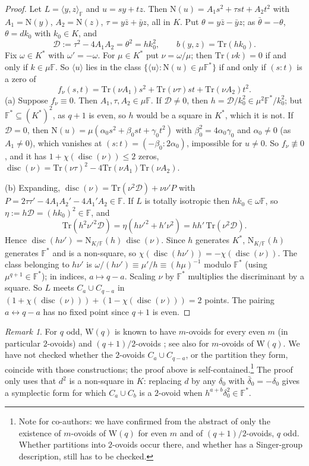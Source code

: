 \documentclass[11pt]{amsart}
\theoremstyle{definition}
\theoremstyle{remark}
\newtheorem{remark}[theorem]{Remark}
\newcommand{\F}{\mathbb{F}}
\newcommand{\Wq}{\mathrm{W}}
\newcommand{\Tr}{\mathrm{Tr}}
\newcommand{\Nm}{\mathrm{N}}
\begin{document}
\begin{proof}
Let $L=\langle y,z\rangle_\F$ and $u=sy+tz$. Then $\Nm(u)=A_1s^2+\tau st+A_2t^2$ with $A_1=\Nm(y)$, $A_2=\Nm(z)$, $\tau=y\bar z+\bar yz$, all in $K$. Put $\theta=y\bar z-\bar yz$; as $\bar\theta=-\theta$, $\theta=dk_0$ with $k_0\in K$, and
\[
\mathcal D:=\tau^2-4A_1A_2=\theta^2=hk_0^2,\qquad b(y,z)=\Tr(hk_0).
\]
Fix $\omega\in K^*$ with $\omega'=-\omega$. For $\mu\in K^*$ put $\nu=\omega/\mu$; then $\Tr(\nu k)=0$ if and only if $k\in\mu\F$. So $\langle u\rangle$ lies in the class $\{\langle u\rangle:\Nm(u)\in\mu\F^*\}$ if and only if $(s{:}t)$ is a zero of
\[
f_\nu(s,t)=\Tr(\nu A_1)s^2+\Tr(\nu\tau)st+\Tr(\nu A_2)t^2 .
\]
(a) Suppose $f_\nu\equiv0$. Then $A_1,\tau,A_2\in\mu\F$. If $\mathcal D\ne0$, then $h=\mathcal D/k_0^2\in\mu^2\F^*/k_0^2$; but $\F^*\subseteq(K^*)^2$, as $q+1$ is even, so $h$ would be a square in $K^*$, which it is not. If $\mathcal D=0$, then $\Nm(u)=\mu(\alpha_0s^2+\beta_0st+\gamma_0t^2)$ with $\beta_0^2=4\alpha_0\gamma_0$ and $\alpha_0\ne0$ (as $A_1\ne0$), which vanishes at $(s{:}t)=(-\beta_0:2\alpha_0)$, impossible for $u\ne0$. So $f_\nu\not\equiv0$, and it has $1+\chi(\operatorname{disc}(\nu))\le2$ zeros, $\operatorname{disc}(\nu)=\Tr(\nu\tau)^2-4\Tr(\nu A_1)\Tr(\nu A_2)$.

(b) Expanding, $\operatorname{disc}(\nu)=\Tr(\nu^2\mathcal D)+\nu\nu'P$ with $P=2\tau\tau'-4A_1A_2'-4A_1'A_2\in\F$. If $L$ is totally isotropic then $hk_0\in\omega\F$, so $\eta:=h\mathcal D=(hk_0)^2\in\F$, and
\[
\Tr(h^2\nu'^2\mathcal D)=\eta(h\nu'^2+h'\nu^2)=hh'\,\Tr(\nu^2\mathcal D).
\]
Hence $\operatorname{disc}(h\nu')=\Nm_{K/\F}(h)\,\operatorname{disc}(\nu)$. Since $h$ generates $K^*$, $\Nm_{K/\F}(h)$ generates $\F^*$ and is a non-square, so $\chi(\operatorname{disc}(h\nu'))=-\chi(\operatorname{disc}(\nu))$. The class belonging to $h\nu'$ is $\omega/(h\nu')\equiv\mu'/h\equiv(h\mu)^{-1}$ modulo $\F^*$ (using $\mu^{q+1}\in\F^*$); in indices, $a\mapsto q-a$. Scaling $\nu$ by $\F^*$ multiplies the discriminant by a square. So $L$ meets $C_a\cup C_{q-a}$ in $(1+\chi(\operatorname{disc}(\nu)))+(1-\chi(\operatorname{disc}(\nu)))=2$ points. The pairing $a\leftrightarrow q-a$ has no fixed point since $q+1$ is even.
\end{proof}

\begin{remark}
For $q$ odd, $\Wq(q)$ is known to have $m$-ovoids for every even $m$ (in particular $2$-ovoids) and $(q+1)/2$-ovoids \cite{BLP09}; see also \cite{CCEM08} for $m$-ovoids of $\Wq(q)$. We have not checked whether the $2$-ovoids $C_a\cup C_{q-a}$, or the partition they form, coincide with those constructions; the proof above is self-contained.\footnote{Note for co-authors: we have confirmed from the abstract of \cite{BLP09} only the existence of $m$-ovoids of $\Wq(q)$ for even $m$ and of $(q+1)/2$-ovoids, $q$ odd. Whether partitions into $2$-ovoids occur there, and whether \cite{CCEM08} has a Singer-group description, still has to be checked.}
The proof only uses that $d^2$ is a non-square in $K$: replacing $d$ by any $\delta_0$ with $\bar\delta_0=-\delta_0$ gives a symplectic form for which $C_a\cup C_{b}$ is a $2$-ovoid when $h^{a+b}\delta_0^2\in\F^*$.
\end{remark}
\end{document}
